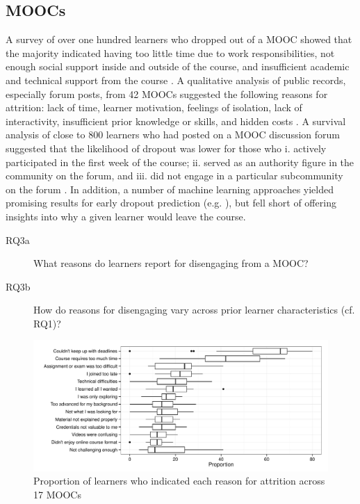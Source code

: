\documentclass{sigchi}\usepackage[]{graphicx}\usepackage[]{color}
\makeatletter
\def\maxwidth{ %
  \ifdim\Gin@nat@width>\linewidth
    \linewidth
  \else
    \Gin@nat@width
  \fi
}
\newenvironment{knitrout}{}{} %
\makeatother
\begin{document}
\subsection{MOOCs}

A survey of over one hundred learners who dropped out of a MOOC showed that the majority indicated having too little time due to work responsibilities, not enough social support inside and outside of the course, and insufficient academic and technical support from the course \cite{gutl2014attrition}. A qualitative analysis of public records, especially forum posts, from 42 MOOCs suggested the following reasons for attrition: lack of time, learner motivation, feelings of isolation, lack of interactivity, insufficient prior knowledge or skills, and hidden costs \cite{khalil2014moocs}. A survival analysis of close to 800 learners who had posted on a MOOC discussion forum suggested that the likelihood of dropout was lower for those who i. actively participated in the first week of the course; ii. served as an authority figure in the community on the forum, and iii. did not engage in a particular subcommunity on the forum \cite{yang2013turn}. In addition, a number of machine learning approaches yielded promising results for early dropout prediction (e.g. \cite{taylor2014likely,halawa2014dropout}), but fell short of offering insights into why a given learner would leave the course.

\begin{description}
\item[RQ3a] What reasons do learners report for disengaging from a MOOC?
\item[RQ3b] How do reasons for disengaging vary across prior learner characteristics (cf. RQ1)?
\end{description}  

\begin{knitrout}
\color{fgcolor}\begin{figure}[ht]

\includegraphics[width=\maxwidth]{figure/s1reason} \caption[Proportion of learners who indicated each reason for attrition across 17 MOOCs]{Proportion of learners who indicated each reason for attrition across 17 MOOCs\label{fig:s1reason}}
\end{figure}


\end{knitrout}
\end{document}
